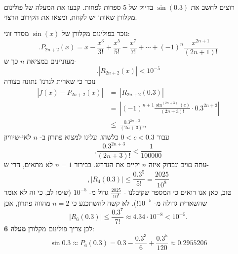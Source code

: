 רוצים לחשב את
\(\sin (0.3)\) בדיוק של 5 ספרות לפחות. קבעו את המעלה של פולינום מקלורן שאותו יש לקחת,
ומצאו את הקירוב הרצוי.
\begin{solbox}
נזכר בפולינום מקלורן של
$\sin(x)$
מסדר זוגי:
\[
.P_{2n+2}(x)=x-\frac{x^3}{3!}+\frac{x^5}{5!}-\frac{x^7}{7!}+\cdots+(-1)^n\frac{x^{2n+1}}{(2n+1)!}
\]
מעוניינים במציאת
$n$
כך ש-
$$.|R_{2n+2}(x)|<10^{-5}$$
נזכר כי שארית לגרנז' נתונה בצורה
\begin{align*}
|f(x)-P_{2n+2}(x)|&=\ |R_{2n+2}(0.3)|\\
&=\ \left|(-1)^{n+1}\frac{\sin^{(2n+3)}(c)}{(2n+3)!}\cdot0.3^{2n+3}\right|\\
&\leq\ \frac{0.3^{2n+3}}{(2n+3)!},
\end{align*}
עבור
$0<c<0.3$
כלשהו.
עלינו למצוא פתרון ב-
$n$
לאי-שיוויון
$$.\frac{0.3^{2n+3}}{(2n+3)!}<\frac{1}{100000}$$
עתה נציב
ונבדוק איזה
$n$
יקיים את הנדרש.
בבירור
$n=1$
לא מתאים, הרי ש-
$$,|R_4(0.3)|\leq\frac{0.3^5}{5!}=\frac{2025}{10^8}$$
טוב, כאן אנו רואים כי המספר שקיבלנו -
$\frac{2025}{10^8}$
גדול מ-
$10^{-5}$
(שימו לב, כי זה לא אומר שהשארית גדולה מ-
$10^{-5}$!).
לא קשה להשתכנע כי
$n=2$
מהווה פתרון, אכן
\[
|R_6(0.3)|\le \frac{0.3^7}{7!}\approx 4.34\cdot 10^{-8}<10^{-5}.
\]
לכן צריך פולינום מקלורן \textbf{מעלה 6}:
$$\sin0.3\approx P_6(0.3)=0.3-\frac{0.3^3}{6}+\frac{0.3^5}{120}\approx0.2955206$$
\end{solbox}
